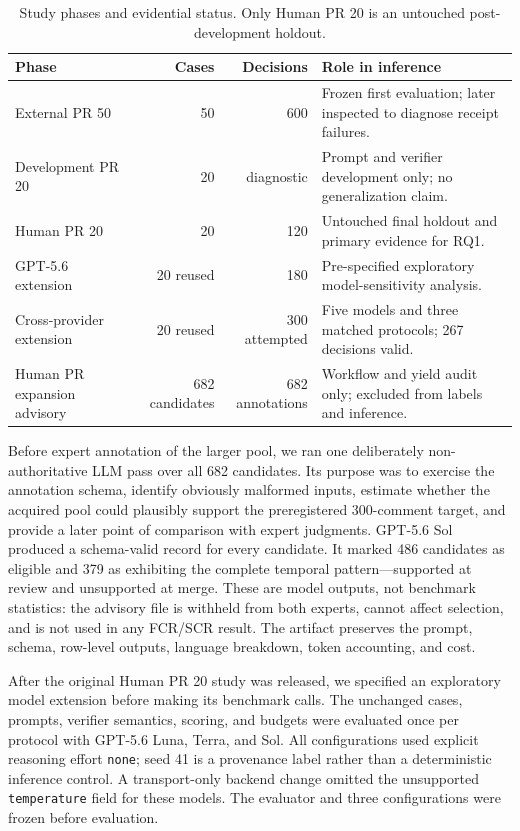 \documentclass[acmsmall,screen,review,anonymous]{acmart}
\begin{document}
\begin{table}[h]
\centering
\caption{Study phases and evidential status. Only Human PR 20 is an untouched post-development holdout.}
\label{tab:evidence-tiers}
\small
\begin{tabularx}{\linewidth}{@{}lrrX@{}}
\toprule
Phase & Cases & Decisions & Role in inference \\
\midrule
External PR 50 & 50 & 600 & Frozen first evaluation; later inspected to diagnose receipt failures. \\
Development PR 20 & 20 & diagnostic & Prompt and verifier development only; no generalization claim. \\
Human PR 20 & 20 & 120 & Untouched final holdout and primary evidence for RQ1. \\
GPT-5.6 extension & 20 reused & 180 & Pre-specified exploratory model-sensitivity analysis. \\
Cross-provider extension & 20 reused & 300 attempted & Five models and three matched protocols; 267 decisions valid. \\
Human PR expansion advisory & 682 candidates & 682 annotations & Workflow and yield audit only; excluded from labels and inference. \\
\bottomrule
\end{tabularx}
\end{table}

Before expert annotation of the larger pool, we ran one deliberately non-authoritative LLM pass over all 682 candidates. Its purpose was to exercise the annotation schema, identify obviously malformed inputs, estimate whether the acquired pool could plausibly support the preregistered 300-comment target, and provide a later point of comparison with expert judgments. GPT-5.6 Sol produced a schema-valid record for every candidate. It marked 486 candidates as eligible and 379 as exhibiting the complete temporal pattern---supported at review and unsupported at merge. These are model outputs, not benchmark statistics: the advisory file is withheld from both experts, cannot affect selection, and is not used in any FCR/SCR result. The artifact preserves the prompt, schema, row-level outputs, language breakdown, token accounting, and cost.

After the original Human PR 20 study was released, we specified an exploratory model extension before making its benchmark calls. The unchanged cases, prompts, verifier semantics, scoring, and budgets were evaluated once per protocol with GPT-5.6 Luna, Terra, and Sol. All configurations used explicit reasoning effort \texttt{none}; seed 41 is a provenance label rather than a deterministic inference control. A transport-only backend change omitted the unsupported \texttt{temperature} field for these models. The evaluator and three configurations were frozen before evaluation.
\end{document}
